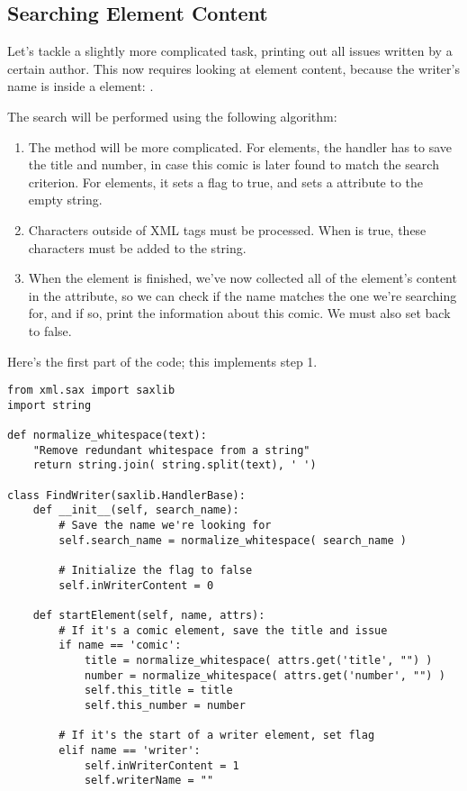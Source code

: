 \documentclass{howto}
\newcommand{\element}[1]{\code{#1}}
\begin{document}
\subsection{Searching Element Content}

Let's tackle a slightly more complicated task, printing out all issues
written by a certain author.  This now requires looking at element
content, because the writer's name is inside a \element{writer}
element: .

The search will be performed using the following algorithm:

\begin{enumerate}
\item 
The  method will be more complicated.  For
\element{comic} elements, the handler has to save the title and
number, in case this comic is later found to match the search
criterion.  For \element{writer} elements, it sets a
 flag to true, and sets a 
attribute to the empty string.

\item Characters outside of XML tags must be processed.  When
 is true, these characters must be added to the
 string.

\item When the \element{writer} element is finished, we've now
collected all of the element's content in the 
attribute, so we can check if the name matches the one we're searching 
for, and if so, print the information about this comic.  We must also
set  back to false.
\end{enumerate}

Here's the first part of the code; this implements step 1.

\begin{verbatim}
from xml.sax import saxlib
import string

def normalize_whitespace(text):
    "Remove redundant whitespace from a string"
    return string.join( string.split(text), ' ')

class FindWriter(saxlib.HandlerBase):
    def __init__(self, search_name):
        # Save the name we're looking for
        self.search_name = normalize_whitespace( search_name )

        # Initialize the flag to false
        self.inWriterContent = 0

    def startElement(self, name, attrs):
        # If it's a comic element, save the title and issue
        if name == 'comic':
            title = normalize_whitespace( attrs.get('title', "") )
            number = normalize_whitespace( attrs.get('number', "") )
            self.this_title = title
            self.this_number = number

        # If it's the start of a writer element, set flag
        elif name == 'writer':
            self.inWriterContent = 1
            self.writerName = ""
\end{verbatim}
\end{document}
